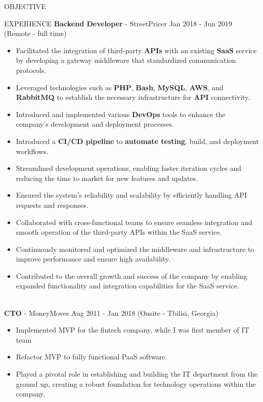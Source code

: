\documentclass{resume} %
\begin{document}
\begin{rSection}{OBJECTIVE}
\begin{rSection}{EXPERIENCE}
   \textbf{Backend Developer} - StreetPricer \hfill Jan 2018 - Jun 2019 (Remote - full time)\\
 \begin{itemize}
    \itemsep -3pt {} 
  \item Facilitated the integration of third-party \textbf{APIs} with an existing \textbf{SaaS} service by developing a gateway
middleware that standardized communication protocols.
\item Leveraged technologies such as \textbf{PHP}, \textbf{Bash}, \textbf{MySQL}, \textbf{AWS}, and \textbf{RabbitMQ} to establish the necessary
infrastructure for \textbf{API} connectivity.
\item Introduced and implemented various \textbf{DevOps} tools to enhance the company's development and
deployment processes.
\item Introduced a \textbf{CI/CD pipeline} to \textbf{automate testing}, build, and deployment workflows.
\item Streamlined development operations, enabling faster iteration cycles and reducing the time to market
for new features and updates.
\item Ensured the system's reliability and scalability by efficiently handling API requests and responses.
\item Collaborated with cross-functional teams to ensure seamless integration and smooth operation of the
third-party APIs within the SaaS service.
\item Continuously monitored and optimized the middleware and infrastructure to improve performance and
ensure high availability.
\item Contributed to the overall growth and success of the company by enabling expanded functionality and
integration capabilities for the SaaS service.
\\
\\
 \end{itemize}
\textbf{CTO} - MoneyMoves \hfill Aug 2011 - Jan 2018 (Onsite - Tbilisi, Georgia)\\
 \begin{itemize}
    \itemsep -3pt {} 
     \item Implemented MVP for the fintech company, while I was first member of IT team
     \item Refactor MVP to fully functional PaaS software.
     \item Played a pivotal role in establishing and building the IT department from the ground up, creating a
robust foundation for technology operations within the company. \\

\end{itemize}
\end{rSection}
\end{rSection}
\end{document}
